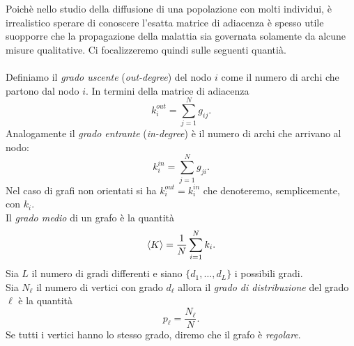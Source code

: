 Poich\`e nello studio della diffusione di una popolazione con molti individui, \`e irrealistico sperare di conoscere l'esatta matrice di adiacenza \`e spesso utile suopporre che la propagazione della malattia sia governata solamente da alcune misure qualitative. Ci focalizzeremo quindi sulle seguenti quanti\`a.\\ \\
Definiamo il \textit{grado uscente} (\textit{out-degree})  del nodo $i$  come il numero di archi che partono dal nodo $i$. In termini della matrice di adiacenza
$$ k_i^{out} =\sum_{j=1}^N g_{ij}.$$
Analogamente il \textit{grado entrante} (\textit{in-degree}) \`e il numero di archi che arrivano al nodo:
$$ k_i^{in} = \sum_{j=1}^N g_{ji}.$$
Nel caso di grafi non orientati si ha $k_i^{out} = k_i^{in}$ che denoteremo, semplicemente, con $k_i$.\\
Il \textit{grado medio} di un grafo \`e la quantit\`a 
$$ \langle K \rangle = \frac{1}{N}\sum_{i=1}^N k_i.$$
Sia $L$ il numero di gradi differenti e siano $\{ d_1, \dots, d_L\}$ i possibili gradi.\\
Sia $N_\ell$ il numero di vertici con grado $d_\ell$ allora il \textit{grado di distribuzione} del grado $\ell$ \`e la quantit\`a
$$ p_\ell = \frac{N_\ell}{N}.$$
Se tutti i vertici hanno lo stesso grado, diremo che il grafo \`e \textit{regolare}.\\  \\
%
